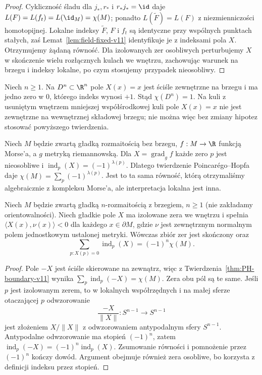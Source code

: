 \begin{proof}
Cykliczność śladu dla $j_*,r_*$ i $r_*j_*=\id$ daje
$L(F)=L(f_t)=L(\id_M)=\chi(M)$; ponadto
$L(\widetilde F)=L(F)$ z niezmienniczości homotopijnej.
Lokalne indeksy $\widetilde F$, $F$ i $f_t$
są identyczne przy wspólnych punktach stałych, zaś
Lemat~\ref{lem:field-fixed-v11} identyfikuje je z indeksami
pola $X$. Otrzymujemy żądaną równość.
Dla izolowanych zer osobliwych perturbujemy $X$ w
skończenie wielu rozłącznych kulach we wnętrzu,
zachowując warunek na brzegu i indeksy lokalne,
po czym stosujemy przypadek nieosobliwy.
\end{proof}

\begin{przyklad}
Niech $n\ge1$. Na $D^n\subset\R^n$ pole $X(x)=x$ jest ściśle zewnętrzne
na brzegu i ma jedno zero w $0$, którego indeks wynosi $+1$.
Stąd $\chi(D^n)=1$. Na kuli z usuniętym wnętrzem mniejszej
współśrodkowej kuli pole $X(x)=x$ nie jest zewnętrzne
na wewnętrznej składowej brzegu; nie można więc bez
zmiany hipotez stosować powyższego twierdzenia.
\end{przyklad}

\begin{przyklad}
Niech $M$ będzie zwartą gładką rozmaitością bez brzegu,
$f:M\to\R$ funkcją Morse'a, a $g$ metryką riemannowską.
Dla $X=\operatorname{grad}_g f$
każde zero $p$ jest nieosobliwe i
$\operatorname{ind}_p(X)=(-1)^{\lambda(p)}$.
Dlatego twierdzenie Poincarégo--Hopfa daje
$\chi(M)=\sum_p(-1)^{\lambda(p)}$.
Jest to ta sama równość, którą otrzymaliśmy algebraicznie
z kompleksu Morse'a, ale interpretacja lokalna jest inna.
\end{przyklad}

\begin{wniosek}
\label{cor:PH-inward-boundary}
Niech $M$ będzie zwartą gładką
$n$-rozmaitością z brzegiem, $n\ge1$
(nie zakładamy orientowalności).
Niech gładkie pole $X$ ma izolowane zera
we wnętrzu i spełnia
$\langle X(x),\nu(x)\rangle<0$
dla każdego $x\in\partial M$,
gdzie $\nu$ jest zewnętrznym normalnym
polem jednostkowym ustalonej metryki.
Wówczas zbiór zer jest skończony oraz
\[
 \sum_{p:X(p)=0}\operatorname{ind}_p(X)
 =(-1)^n\chi(M).
\]
\end{wniosek}
\begin{proof}
Pole $-X$ jest ściśle skierowane na zewnątrz,
więc z Twierdzenia~\ref{thm:PH-boundary-v11}
wynika $\sum_p\operatorname{ind}_p(-X)=\chi(M)$.
Zera obu pól są te same. Jeśli $p$ jest izolowanym
zerem, to w lokalnych współrzędnych i na małej
sferze otaczającej $p$ odwzorowanie
\[
 \frac{-X}{\|X\|}:
 S^{n-1}\longrightarrow S^{n-1}
\]
jest złożeniem $X/\|X\|$ z odwzorowaniem
antypodalnym sfery $S^{n-1}$.
Antypodalne odwzorowanie ma stopień $(-1)^n$,
zatem
$\operatorname{ind}_p(-X)=(-1)^n\operatorname{ind}_p(X)$.
Zsumowanie równości i pomnożenie przez
$(-1)^n$ kończy dowód. Argument obejmuje
również zera osobliwe, bo korzysta
z definicji indeksu przez stopień.
\end{proof}


